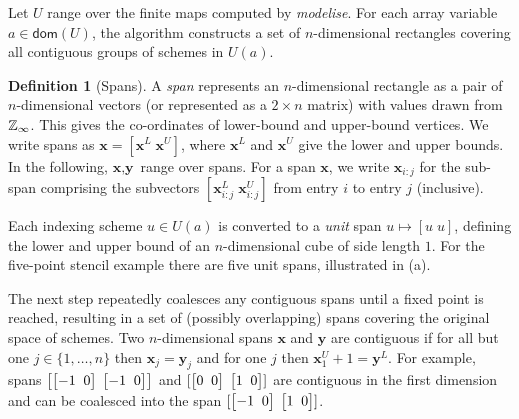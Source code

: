 \documentclass[10pt,preprint,numbers]{sigplanconf}
\newcounter{block}
\theoremstyle{definition}
\newtheorem{definition}[block]{Definition}
\newcommand{\vect}[1]{\textbf{#1}}
\newcommand{\vtwoh}[2]{\setlength{\arraycolsep}{0em}
\left[\begin{array}{cc}#1 \; & \; #2\end{array}\right]}
\begin{document}
Let $U$ range over the finite maps computed by \textit{modelise}.  For
each array variable $a \in \mathsf{dom}(U)$, the algorithm constructs a set of
$n$-dimensional rectangles covering all contiguous groups of schemes
in $U(a)$.

\newcommand{\spanOp}{\textsf{spans}}

\begin{definition}[Spans]
  A \emph{span} represents an $n$-dimensional rectangle
  as a pair of $n$-dimensional vectors (or
  represented as a $2 \times n$ matrix) with values drawn from
  $\mathbb{Z}_\infty{}$. This gives the co-ordinates of lower-bound 
  and upper-bound vertices. We write
  spans as $\vect{x} = [\vect{x}^L \; \vect{x}^U]$, where $\vect{x}^L$
  and $\vect{x}^U$ give the lower and upper bounds.  In
  the following, $\vect{x}, \vect{y}$ range over spans.  For a span
  $\vect{x}$, we write $\vect{x}_{i:j}$ for the sub-span comprising the
  subvectors $[\vect{x}^L_{i:j} \; \vect{x}^U_{i:j}]$ from entry $i$
  to entry $j$ (inclusive).
\end{definition}

\noindent
Each indexing scheme $u \in U(a)$ is converted to a \emph{unit} span
$u \mapsto [u \; u]$, defining the lower and upper bound of an
$n$-dimensional cube of side length $1$. For the five-point stencil
example there are five unit spans, illustrated in
(a).

The next step repeatedly coalesces any contiguous spans until a fixed
point is reached, resulting in a set of (possibly overlapping) spans
covering the original space of schemes. Two $n$-dimensional spans
$\vect{x}$ and $\vect{y}$ are contiguous if for all but one
$j \in \{1, \ldots, n\}$ then $\vect{x}_j = \vect{y}_j$ and for one
$j$ then $\vect{x}^U_1 + 1 = \vect{y}^L$. For example, spans
$\left[\vtwoh{-1}{0}\; \vtwoh{-1}{0}\right]$ and
$[\vtwoh{0}{0} \; \vtwoh{1}{0}]$ are contiguous in the first dimension
and can be coalesced into the span $[\vtwoh{-1}{0} \; \vtwoh{1}{0}]$.
\end{document}
